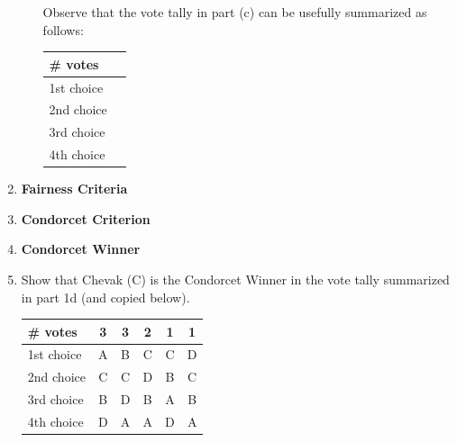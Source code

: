 \documentclass[12pt]{article}
\begin{document}
\begin{enumerate}
\begin{enumerate}
 Observe that the vote tally in part (c) can be usefully summarized as follows:\\

\begin{tabular}{l || c }
\# votes&\quad \hspace{4in} \quad\\
\hline
1st choice&\\
2nd choice&\\
3rd choice&\\
4th choice&\\
\end{tabular}

\end{enumerate}

\newpage

\item \textbf{Fairness Criteria}\\
\vfill

\item \textbf{Condorcet Criterion}\\
\vspace{1in}

\item \textbf{Condorcet Winner}\\
\vspace{1in}

\item Show that Chevak (C) is the Condorcet Winner in the vote tally summarized in part 1d (and copied below).\\

\begin{tabular}{l || c |c|c|c|c}
\# votes&3&3&2&1&1\\
\hline
1st choice&A&B&C&C&D\\
2nd choice&C&C&D&B&C\\
3rd choice&B&D&B&A&B\\
4th choice&D&A&A&D&A\\
\end{tabular}

\vfill
\end{enumerate}
\end{document}
